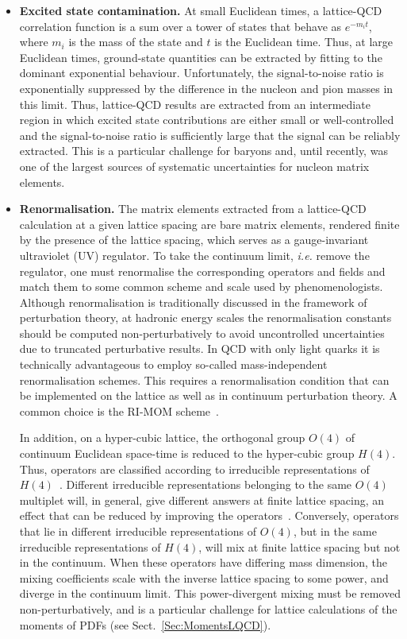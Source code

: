\begin{itemize}
\item {\bfseries Excited state contamination.} 
At small Euclidean times, a lattice-QCD correlation function
is a sum over a tower of states that behave as $e^{-m_it}$, where $m_i$ is the 
mass of the state and $t$ is the Euclidean time. 
%
Thus, at large Euclidean times, ground-state quantities can be extracted by 
fitting to the dominant exponential behaviour.
%
Unfortunately, the signal-to-noise ratio is exponentially suppressed by the 
difference in the nucleon and pion masses in this limit. 
%
Thus, lattice-QCD results are extracted from an intermediate region in which 
excited state contributions are either small or well-controlled and the 
signal-to-noise ratio is sufficiently large that the signal can be reliably 
extracted. 
%
This is a particular challenge for baryons and, until recently, was one of the 
largest sources of systematic uncertainties for nucleon matrix elements.

\item {\bfseries Renormalisation.} 
The matrix elements extracted from a lattice-QCD calculation at a given 
lattice spacing are bare matrix elements, rendered finite by the presence of 
the lattice spacing, which serves as a gauge-invariant ultraviolet (UV) 
regulator. 
%
To take the continuum limit, {\it i.e.} remove the regulator, one must 
renormalise the corresponding operators and fields and match them to some 
common scheme and scale used by phenomenologists. 
%
Although renormalisation is traditionally discussed in the framework of 
perturbation theory, at hadronic energy scales the renormalisation constants 
should be computed non-perturbatively to avoid uncontrolled uncertainties due 
to truncated perturbative results.
%
In QCD with only light quarks it is technically advantageous to employ 
so-called mass-independent renormalisation schemes.
%
This requires a renormalisation condition that can be
implemented on the lattice as well as in continuum perturbation theory. 
%
A common choice is the RI-MOM scheme~\cite{Martinelli:1994ty}.

In addition, on a hyper-cubic lattice, the orthogonal group $O(4)$ of
continuum Euclidean space-time is reduced to the hyper-cubic group $H(4)$.
%
Thus, operators are classified according to irreducible
representations of $H(4)$~\cite{Gockeler:1996mu}.
%
Different irreducible representations belonging to the same $O(4)$ multiplet
will, in general, give different answers at finite lattice spacing, an
effect that can be reduced by improving the operators~\cite{Gockeler:2004wp}.
%
Conversely, operators that lie in different irreducible representations of 
$O(4)$, but in the same irreducible representations of $H(4)$, will mix at 
finite lattice spacing but not in the continuum. 
%
When these operators have differing mass dimension,
the mixing coefficients scale with the inverse lattice spacing to some
power, and diverge in the continuum limit.
%
This power-divergent mixing must be removed non-perturbatively, and is a 
particular challenge for lattice calculations of the moments of PDFs (see
Sect.~\ref{Sec:MomentsLQCD}).


\end{itemize}
